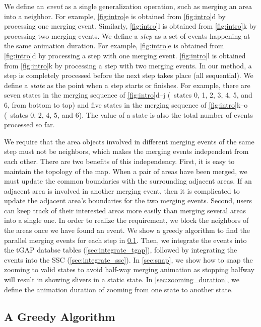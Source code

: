 \documentclass[]{interact}
\begin{document}
We define an \emph{event} as a single generalization operation, 
such as merging an area into a neighbor.
For example, \fig\ref{fig:intro}e is obtained from 
\fig\ref{fig:intro}d by processing one merging event.
Similarly, \fig\ref{fig:intro}l is obtained from 
\fig\ref{fig:intro}k by processing two merging events.
We define a \emph{step} as 
a set of events happening at the same animation duration.
For example, 
\fig\ref{fig:intro}e is obtained from 
\fig\ref{fig:intro}d by processing a step with one merging event.
\fig\ref{fig:intro}l is obtained from 
\fig\ref{fig:intro}k by processing a step with two merging events.
In our method, a step is completely processed 
before the next step takes place (all sequential).
We define a \emph{state} as the point when a step starts or finishes.
For example, there are seven states 
in the merging sequence of \figs\ref{fig:intro}d--j
(\ie~states 0, 1, 2, 3, 4, 5, and 6, from bottom to top)
and five states in the merging sequence of \figs\ref{fig:intro}k--o 
(\ie~states 0, 2, 4, 5, and 6).
The value of a state is also the total number of events processed so far.


We require that 
the area objects involved in different merging events of the same step 
must not be neighbors, 
which makes the merging events independent from each other.
There are two benefits of this independency.
First, it is easy to maintain the topology of the map.
When a pair of areas have been merged, 
we must update the common boundaries with the surrounding adjacent areas.
If an adjacent area is involved in another merging event,
then it is complicated to update the adjacent area's boundaries
for the two merging events.
Second, users can keep track of their interested areas more easily
than merging several areas into a single one.
In order to realize the requirement,
we block the neighbors of the areas once we have found an event.
We show a greedy algorithm to find the parallel merging events for each step
in \sect\ref{sec:greedy_algo}.
Then, we integrate the events into the tGAP databse tables
(\sect\ref{sec:integrate_tgap}),
followed by integrating the events into the SSC 
(\sect\ref{sec:integrate_ssc}).
In \sect\ref{sec:snap}, we show how to snap the zooming to valid states
to avoid half-way merging animation 
as stopping halfway will result in showing slivers in a static state.
In \sect\ref{sec:zooming_duration}, we define 
the animation duration of zooming from one state to another state.



\subsection{A Greedy Algorithm}
\label{sec:greedy_algo}
\end{document}

